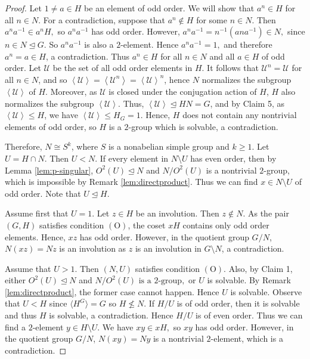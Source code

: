 \documentclass[twoside,a4paper,reqno,11pt]{amsart}
\newcommand{\<}{\langle}
\renewcommand{\>}{\rangle}
\newcommand{\leqs}{\leqslant}
\newcommand{\geqs}{\geqslant}
\newcommand{\OO}{\mathrm {(O)}}
\renewcommand{\leq}{\leqs}
\renewcommand{\geq}{\geqs}
\renewcommand{\:}{\colon}
\theoremstyle{definition}
\begin{document}
\begin{proof}
Let $1 \neq a \in H$ be an element of odd order. We will show that $a^n\in H$ for all $n\in N$. For a contradiction, suppose   that $a^n \notin H$ for some $n \in N$. Then 
$a^n a^{-1} \in a^n H,$
so $a^n a^{-1}$ has odd order. However,
$a^n a^{-1} = n^{-1} (a n a^{-1}) \in N,$
since $n \in N \trianglelefteq G$. So $a^n a^{-1}$ is also a $2$-element. Hence
$a^n a^{-1} = 1,$
and therefore $a^n = a \in H$, a contradiction.
Thus $a^n \in H$ for all $n \in N$ and all $a \in H$ of odd order. Let $\mathcal{U}$ be the set of all odd order elements in $H$. It follows that $\mathcal{U}^n = \mathcal{U}$ for all $n\in N$, and so $\left<\mathcal{U}\right> = \left<\mathcal{U}^n\right> = \left<\mathcal{U}\right>^n$, hence $N$ normalizes the subgroup $\left<\mathcal{U}\right>$ of $H$. Moreover, as $\mathcal{U}$ is closed under the conjugation action of $H$, $H$ also normalizes the subgroup $\left<\mathcal{U}\right>$. Thus, $\left<\mathcal{U}\right> \unlhd HN = G$, and by Claim 5, as $\left<\mathcal{U}\right>\leq H$, we have $\left<\mathcal{U}\right> \leq H_G=1$. Hence, $H$ does not contain any nontrivial elements of odd order, so $H$ is a $2$-group which is solvable, a contradiction. 


Therefore,
$N \cong S^k$,
where $S$ is a nonabelian simple group and $k \geq 1$. Let $U = H \cap N$. Then $U < N$. If every element in $N \setminus U$ has even order, then by Lemma \ref{lem:p-singular}, 
$O^2(U) \trianglelefteq N$
and $N / O^2(U)$ is a nontrivial $2$-group, which is impossible by Remark \ref{lem:directproduct}. Thus we can find $x \in N \setminus U$ of odd order. Note that $U \trianglelefteq H$.


Assume first that $U = 1$. Let $z \in H$ be an involution. Then $z \notin N$. As the pair $(G, H)$ satisfies condition $\OO$, the coset $xH$ contains only odd order elements. Hence, $xz$ has odd order. However, in the quotient group $G/N$, $N(xz) = Nz$ is an involution as $z$ is an involution in $G\setminus N$, a contradiction.  


Assume that $U > 1$. Then $(N, U)$ satisfies condition $\OO$. Also, by Claim 1, either
$O^2(U) \trianglelefteq N $  {and} $ N / O^2(U) \text{ is a } 2\text{-group},$
or $U$ is solvable. By Remark \ref{lem:directproduct}, the former case cannot happen. Hence $U$ is solvable.
Observe that $U < H$ since $\langle H^G \rangle = G$ so $H \not\leq N$. If $H / U$ is of odd order, then it is solvable and thus $H$ is solvable, a contradiction. Hence $H / U$ is of even order. Thus we can find a $2$-element $y \in H \setminus U$. We have
$
x y \in x H,$
so $x y$ has odd order. However, in the quotient group $G/N$, $N(xy) = Ny$ is a nontrivial $2$-element, which is a contradiction. 



\end{proof}
\end{document}
